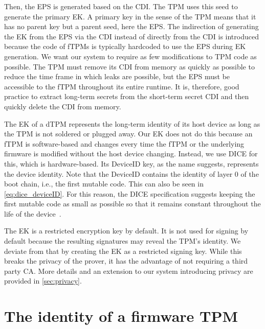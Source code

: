 Then, the \ac{EPS} is generated based on the \ac{CDI}\@.
The \ac{TPM} uses this seed to generate the primary \ac{EK}.
A primary key in the sense of the TPM means that it has no parent key but a parent seed, here the \ac{EPS}\@.
The indirection of generating the \ac{EK} from the \ac{EPS} via the \ac{CDI} instead of directly from the \ac{CDI} is introduced because the code of fTPMs is typically hardcoded to use the \ac{EPS} during \ac{EK} generation.
We want our system to require as few modifications to TPM code as possible.
The \ac{TPM} must remove its \ac{CDI} from memory as quickly as possible to reduce the time frame in which leaks are possible, but the \ac{EPS} must be accessible to the \ac{fTPM} throughout its entire runtime.
It is, therefore, good practice to extract long-term secrets from the short-term secret \ac{CDI} and then quickly delete the \ac{CDI} from memory.


The \ac{EK} of a \ac{dTPM} represents the long-term identity of its host device as long as the \ac{TPM} is not soldered or plugged away.
Our \ac{EK} does not do this because an \ac{fTPM} is software-based and changes every time the \ac{fTPM} or the underlying firmware is modified without the host device changing.
Instead, we use \ac{DICE} for this, which is hardware-based.
Its DeviceID key, as the name suggests, represents the device identity.
Note that the DeviceID contains the identity of layer 0 of the boot chain, i.e., the first mutable code.
This can also be seen in \autoref{eq:dice_deviceID}.
For this reason, the DICE specification suggests keeping the first mutable code as small as possible so that it remains constant throughout the life of the device~\cite{dice-layering-arch}.


The \ac{EK} is a restricted encryption key by default.
It is not used for signing by default because the resulting signatures may reveal the TPM's identity.
We deviate from that by creating the \ac{EK} as a restricted signing key.
While this breaks the privacy of the prover, it has the advantage of not requiring a third party \ac{CA}\@.
More details and an extension to our system introducing privacy are provided in \autoref{sec:privacy}.

\section{The identity of a firmware TPM}

